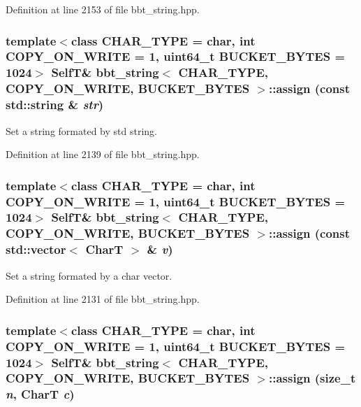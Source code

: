 Definition at line 2153 of file bbt\_\-string.hpp.\hypertarget{classbbt__string_1d91c8aa0f24df605052b7bd2490bed4}{
\subsubsection[{assign}]{\setlength{\rightskip}{0pt plus 5cm}template$<$class CHAR\_\-TYPE  = char, int COPY\_\-ON\_\-WRITE = 1, uint64\_\-t BUCKET\_\-BYTES = 1024$>$ {\bf SelfT}\& {\bf bbt\_\-string}$<$ CHAR\_\-TYPE, COPY\_\-ON\_\-WRITE, BUCKET\_\-BYTES $>$::assign (const std::string \& {\em str})}}
\label{classbbt__string_1d91c8aa0f24df605052b7bd2490bed4}


Set a string formated by std string. 

Definition at line 2139 of file bbt\_\-string.hpp.\hypertarget{classbbt__string_4e5b4bef27753e3dacc0523ec42f4d7e}{
\subsubsection[{assign}]{\setlength{\rightskip}{0pt plus 5cm}template$<$class CHAR\_\-TYPE  = char, int COPY\_\-ON\_\-WRITE = 1, uint64\_\-t BUCKET\_\-BYTES = 1024$>$ {\bf SelfT}\& {\bf bbt\_\-string}$<$ CHAR\_\-TYPE, COPY\_\-ON\_\-WRITE, BUCKET\_\-BYTES $>$::assign (const std::vector$<$ CharT $>$ \& {\em v})}}
\label{classbbt__string_4e5b4bef27753e3dacc0523ec42f4d7e}


Set a string formated by a char vector. 

Definition at line 2131 of file bbt\_\-string.hpp.\hypertarget{classbbt__string_34dde768fe5e866486424320e052228f}{
\subsubsection[{assign}]{\setlength{\rightskip}{0pt plus 5cm}template$<$class CHAR\_\-TYPE  = char, int COPY\_\-ON\_\-WRITE = 1, uint64\_\-t BUCKET\_\-BYTES = 1024$>$ {\bf SelfT}\& {\bf bbt\_\-string}$<$ CHAR\_\-TYPE, COPY\_\-ON\_\-WRITE, BUCKET\_\-BYTES $>$::assign (size\_\-t {\em n}, \/  CharT {\em c})}}
\label{classbbt__string_34dde768fe5e866486424320e052228f}


